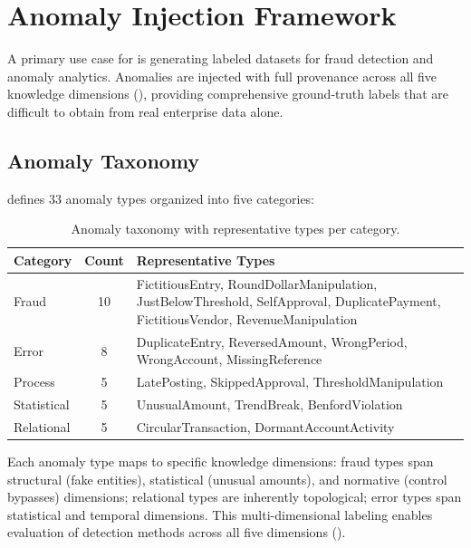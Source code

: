 \section{Anomaly Injection Framework}
\label{sec:anomaly_injection}

A primary use case for \system{} is generating labeled datasets for
fraud detection and anomaly analytics.  Anomalies are injected with
full provenance across all five knowledge dimensions
(), providing comprehensive ground-truth labels that are
difficult to obtain from real enterprise data alone.

\subsection{Anomaly Taxonomy}
\label{sec:anom_taxonomy}

\system{} defines 33 anomaly types organized into five categories:

\begin{table}[t]
\centering
\caption{Anomaly taxonomy with representative types per category.}
\label{tab:anomaly_types}
\small
\begin{tabular}{p{2.4cm}cp{7.5cm}}
\toprule
\textbf{Category} & \textbf{Count} & \textbf{Representative Types} \\
\midrule
Fraud & 10 & FictitiousEntry, RoundDollarManipulation,
  JustBelowThreshold, SelfApproval, DuplicatePayment,
  FictitiousVendor, RevenueManipulation \\
Error & 8 & DuplicateEntry, ReversedAmount, WrongPeriod,
  WrongAccount, MissingReference \\
Process & 5 & LatePosting, SkippedApproval,
  ThresholdManipulation \\
Statistical & 5 & UnusualAmount, TrendBreak,
  BenfordViolation \\
Relational & 5 & CircularTransaction,
  DormantAccountActivity \\
\bottomrule
\end{tabular}
\end{table}

Each anomaly type maps to specific knowledge dimensions: fraud types
span structural (fake entities), statistical (unusual amounts), and
normative (control bypasses) dimensions; relational types are inherently
topological; error types span statistical and temporal dimensions.  This
multi-dimensional labeling enables evaluation of detection methods across
all five dimensions ().

